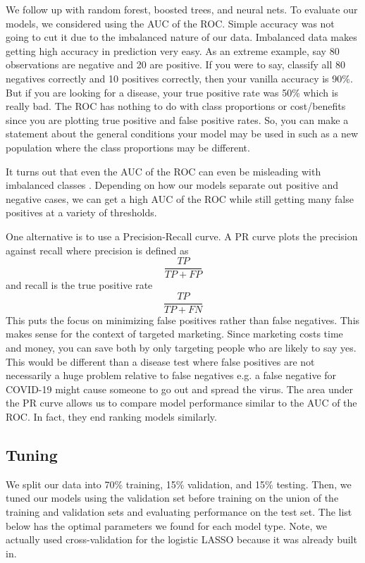 \documentclass[12pt]{article}
\begin{document}
We follow up with random forest, boosted trees, and neural nets. 
To evaluate our models, we considered using the AUC of the ROC. Simple accuracy was not going to cut it due to the imbalanced nature of our data. Imbalanced data makes getting high accuracy in prediction very easy. As an extreme example, say 80 observations are negative and 20 are positive. If you were to say, classify all 80 negatives correctly and 10 positives correctly, then your vanilla accuracy is 90\%. But if you are looking for a disease, your true positive rate was 50\% which is really bad. The ROC has nothing to do with class proportions or cost/benefits since you are plotting true positive and false positive rates. So, you can make a statement about the general conditions your model may be used in such as a new population where the class proportions may be different. 

It turns out that even the AUC of the ROC can even be misleading with imbalanced classes \cite{ml_master}. Depending on how our models separate out positive and negative cases, we can get a high AUC of the ROC while still getting many false positives at a variety of thresholds.

One alternative is to use a Precision-Recall curve. A PR curve plots the precision against recall where precision is defined as 
$$\frac{TP}{TP + FP}$$
and recall is the true positive rate
$$\frac{TP}{TP + FN}$$
This puts the focus on minimizing false positives rather than false negatives. This makes sense for the context of targeted marketing. Since marketing costs time and money, you can save both by only targeting people who are likely to say yes. This would be different than a disease test where false positives are not necessarily a huge problem relative to false negatives e.g. a false negative for COVID-19 might cause someone to go out and spread the virus. The area under the PR curve allows us to compare model performance similar to the AUC of the ROC. In fact, they end ranking models similarly. 

\subsection*{Tuning}
We split our data into 70\% training, 15\% validation, and 15\% testing. Then, we tuned our models using the validation set before training on the union of the training and validation sets and evaluating performance on the test set. The list below has the optimal parameters we found for each model type. Note, we actually used cross-validation for the logistic LASSO because it was already built in.
\end{document}
